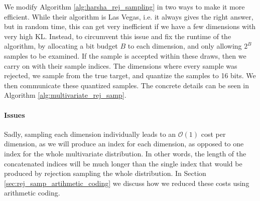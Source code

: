 \documentclass{article}
\newcommand{\Oh}{\mathcal{O}}
\begin{document}
\par
We modify Algorithm \ref{alg:harsha_rej_sampling} in two ways to make it more
efficient. While their algorithm is Las Vegas, i.e. it always gives the right
answer, but in random time, this can get very inefficient if we have a few
dimensions with very high KL. Instead, to circumvent this issue and fix the
runtime of the algorithm, by allocating a bit budget $B$ to each dimension, and
only allowing $2^B$ samples to be examined. If the sample is accepted within
these draws, then we carry on with their sample indices. The
dimensions where every sample was rejected, we sample from the true target,
and quantize the samples to 16 bits. We then communicate these quantized
samples. The concrete details can be seen in Algorithm
\ref{alg:multivariate_rej_samp}.

\paragraph{Issues} Sadly, sampling each dimension individually leads to an
$\Oh(1)$ cost per dimension, as we will produce an index for each dimension, as
opposed to one index for the whole multivariate distribution. In other words,
the length of the concatenated indices will be much longer than the single index
that would be produced by rejection sampling the whole distribution. In Section
\ref{sec:rej_samp_artihmetic_coding} we discuss how we reduced these costs using
arithmetic coding.
\end{document}
